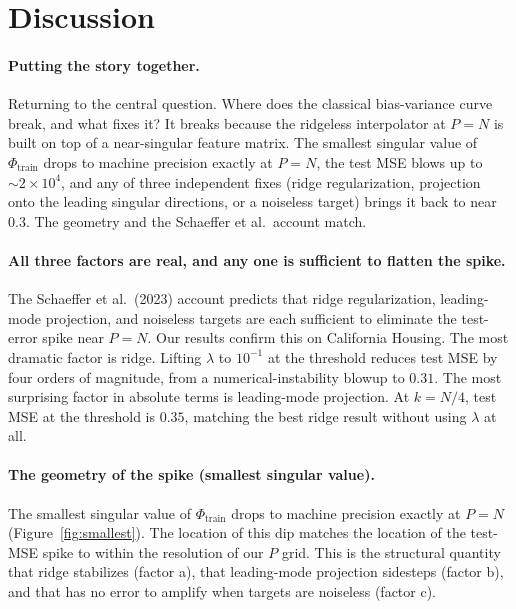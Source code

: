 \documentclass{article}
\begin{document}
\section{Discussion}

\paragraph{Putting the story together.}
Returning to the central question. Where does the classical bias-variance curve break, and what fixes it? It breaks because the ridgeless interpolator at $P = N$ is built on top of a near-singular feature matrix. The smallest singular value of $\Phi_{\text{train}}$ drops to machine precision exactly at $P = N$, the test MSE blows up to $\sim 2 \times 10^4$, and any of three independent fixes (ridge regularization, projection onto the leading singular directions, or a noiseless target) brings it back to near $0.3$. The geometry and the Schaeffer et al.\ account match.

\paragraph{All three factors are real, and any one is sufficient to flatten the spike.}
The Schaeffer et al.\ (2023) account predicts that ridge regularization, leading-mode projection, and noiseless targets are each sufficient to eliminate the test-error spike near $P = N$. Our results confirm this on California Housing. The most dramatic factor is ridge. Lifting $\lambda$ to $10^{-1}$ at the threshold reduces test MSE by four orders of magnitude, from a numerical-instability blowup to $0.31$. The most surprising factor in absolute terms is leading-mode projection. At $k = N/4$, test MSE at the threshold is $0.35$, matching the best ridge result without using $\lambda$ at all.

\paragraph{The geometry of the spike (smallest singular value).}
The smallest singular value of $\Phi_{\text{train}}$ drops to machine precision exactly at $P = N$ (Figure~\ref{fig:smallest}). The location of this dip matches the location of the test-MSE spike to within the resolution of our $P$ grid. This is the structural quantity that ridge stabilizes (factor a), that leading-mode projection sidesteps (factor b), and that has no error to amplify when targets are noiseless (factor c).
\end{document}
